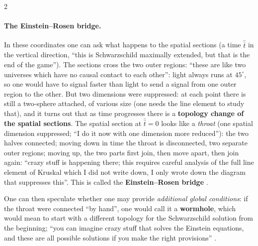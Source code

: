 \begin{paracol}{2}
\paragraph{The Einstein--Rosen bridge.} In these coordinates one can ask what happens to the spatial sections (a time $\bar{\bar t}$ in the vertical direction, ``this is Schwarzschild maximally extended, but that is the end of the game''). The sections cross the two outer regions: ``these are like two universes which have no causal contact to each other'': light always runs at $45^\circ$, so one would have to signal faster than light to send a signal from one outer region to the other. But two dimensions were suppressed: at each point there is still a two-sphere attached, of various size (one needs the line element to study that), and it turns out that as time progresses there is a \textbf{topology change of the spatial sections}. The spatial section at $\bar{\bar t}=0$ looks like a \emph{throat} (one spatial dimension suppressed; ``I do it now with one dimension more reduced''): the two halves connected; moving down in time the throat is disconnected, two separate outer regions; moving up, the two parts first join, then move apart, then join again: ``crazy stuff is happening there; this requires careful analysis of the full line element of Kruskal which I did not write down, I only wrote down the diagram that suppresses this''. This is called the \textbf{Einstein--Rosen bridge} .
\begin{coursenote}
One can then speculate whether one may provide \emph{additional global conditions}: if the throat were connected ``by hand'', one would call it a \textbf{wormhole}, which would mean to start with a different topology for the Schwarzschild solution from the beginning; ``you can imagine crazy stuff that solves the Einstein equations, and these are all possible solutions if you make the right provisions'' .
\end{coursenote}


\end{paracol}
